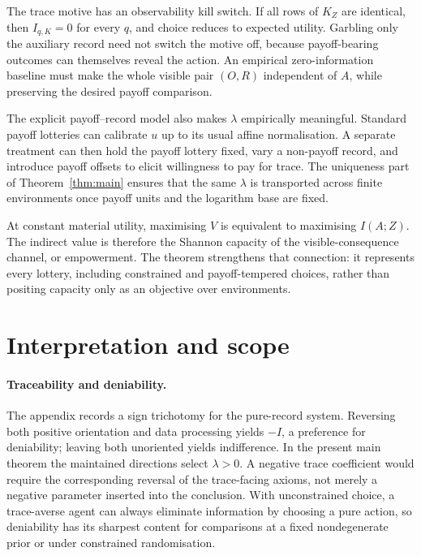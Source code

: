 \documentclass[11pt,a4paper]{article}
\theoremstyle{definition}
\newcommand{\1}{\mathbf 1}
\begin{document}
The trace motive has an observability kill switch.  If all rows of $K_Z$ are identical, then $I_{q,K}=0$ for every
$q$, and choice reduces to expected utility.  Garbling only the auxiliary record need not switch the motive off,
because payoff-bearing outcomes can themselves reveal the action.  An empirical zero-information baseline must make
the whole visible pair $(O,R)$ independent of $A$, while preserving the desired payoff comparison.

The explicit payoff--record model also makes $\lambda$ empirically meaningful.  Standard payoff lotteries can
calibrate $u$ up to its usual affine normalisation.  A separate treatment can then hold the payoff lottery fixed,
vary a non-payoff record, and introduce payoff offsets to elicit willingness to pay for trace.  The uniqueness part of
Theorem~\ref{thm:main} ensures that the same $\lambda$ is transported across finite environments once payoff units and
the logarithm base are fixed.

At constant material utility, maximising $V$ is equivalent to maximising $I(A;Z)$.  The indirect value is therefore
the Shannon capacity of the visible-consequence channel, or empowerment.  The theorem strengthens that connection:
it represents every lottery, including constrained and payoff-tempered choices, rather than positing capacity only as
an objective over environments.

\section{Interpretation and scope}

\paragraph{Traceability and deniability.}
The appendix records a sign trichotomy for the pure-record system.  Reversing both positive orientation and data
processing yields $-I$, a preference for deniability; leaving both unoriented yields indifference.  In the present main
theorem the maintained directions select $\lambda>0$.  A negative trace coefficient would require the corresponding
reversal of the trace-facing axioms, not merely a negative parameter inserted into the conclusion.  With unconstrained
choice, a trace-averse agent can always eliminate information by choosing a pure action, so deniability has its sharpest
content for comparisons at a fixed nondegenerate prior or under constrained randomisation.
\end{document}
